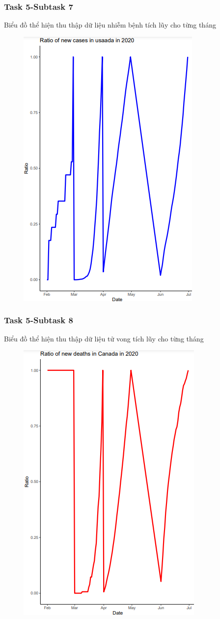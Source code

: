 \documentclass[english,10pt,table]{beamer}
\begin{document}
\frame
{
    \frametitle{Task 5-Subtask 7}
    \begin{block}{Biểu đồ thể hiện thu thập dữ liệu nhiễm bệnh tích lũy cho từng tháng}
    \begin{figure}[H]
		\centering
		\includegraphics[scale=0.5]{images/5.7.3.png}
	\end{figure}
    \end{block}
}
\frame
{
    \frametitle{Task 5-Subtask 8}
    \begin{block}{Biểu đồ thể hiện thu thập dữ liệu tử vong tích lũy cho từng tháng}
    \begin{figure}[H]
		\centering
		\includegraphics[scale=0.5]{images/5.8.1.png}
	\end{figure}
    \end{block}
}
\end{document}
